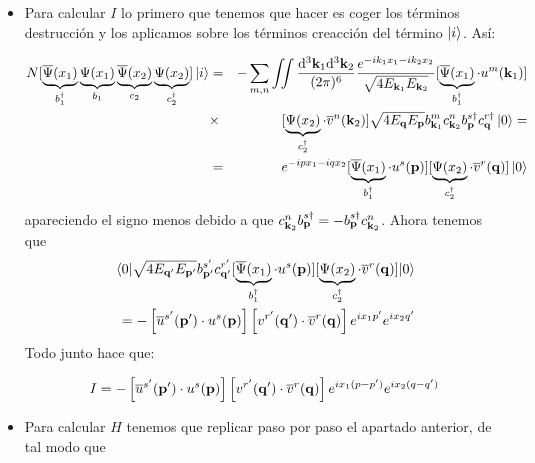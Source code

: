 \begin{solucion}
	\begin{itemize}
		\item Para calcular $I$ lo primero que tenemos que hacer es coger los términos destrucción y los aplicamos sobre los términos creacción del término $\ket{i}$. Así:
		
		\begin{eqnarray*}
				N[ \underbrace{ \overline{\Psi} (x_1)}_{b^\dagger_1}\underbrace{ \Psi (x_1)}_{b_1} \underbrace{ \overline{\Psi} 	(x_2)}_{c_2} \underbrace{ \Psi (x_2)}_{c^\dagger_2} ] \ket{i} & = & -\sum_{m,n} \iint \frac{\mathrm{d}^3 \mathbf{k}_1 \mathrm{d}^3 \mathbf{k}_2}{(2\pi)^6} \frac{e^{-i k_1 x_1 - i k_2 x_2}}{\sqrt{4E_{\mathbf{k}_1}E_{\mathbf{k}_2}}} [\underbrace{ \overline{\Psi} (x_1)}_{b^\dagger_1} \cdot u^m(\mathbf{k}_1)]  \\ & \times & [\underbrace{ \Psi (x_2)}_{c^\dagger_2} \cdot \overline{v}^n(\mathbf{k}_2)] \sqrt{4E_{\mathbf{q}} E_{\mathbf{p}}} b_{\mathbf{k}_1}^m c_{\mathbf{k}_2}^n b_{\mathbf{p}}^{s\dagger} c_ {\mathbf{q}}^{r \dagger}  \ket{0} =  \\
				& = &  e^{-i p x_1 - i q x_2} [\underbrace{ \overline{\Psi} (x_1)}_{b^\dagger_1} \cdot u^s(\mathbf{p})]  [\underbrace{ \Psi (x_2)}_{c^\dagger_2} \cdot \overline{v}^r(\mathbf{q})]  \ket{0}  
		\end{eqnarray*}
		apareciendo el signo menos debido a que $c_{\mathbf{k}_2}^n b_{\mathbf{p}}^{s\dagger}=- b_{\mathbf{p}}^{s\dagger}c_{\mathbf{k}_2}^n$. Ahora tenemos que 
		\begin{eqnarray*}
			\mel{0}{ \sqrt{4E_{\mathbf{q}'} E_{\mathbf{p}'}} b_{\mathbf{p}'}^{s'} c_{\mathbf{q}'}^{r'} [\underbrace{ \overline{\Psi}(x_1)}_{b^\dagger_1} \cdot u^s(\mathbf{p})] [\underbrace{ \Psi (x_2)}_{c^\dagger_2} \cdot \overline{v}^r(\mathbf{q})] }{0} \\ =- \left[ \overline{u}^{s'}(\mathbf{p}') \cdot u^{s}(\mathbf{p}) \right] \left[ v^{r'}(\mathbf{q}') \cdot \overline{v}^{r}(\mathbf{q}) \right] e^{ix_1  p'} e^{ix_2 q'}
		\end{eqnarray*}
		Todo junto hace que:
		
		\begin{equation*}
			I = - \left[ \overline{u}^{s'}(\mathbf{p}') \cdot u^{s}(\mathbf{p}) \right] \left[ v^{r'}(\mathbf{q}') \cdot \overline{v}^{r}(\mathbf{q}) \right]e^{ix_1(p-p')}e^{ix_2(q-q')}
		\end{equation*}
		
		\item Para calcular $H$ tenemos que replicar paso por paso el apartado anterior, de tal modo que 
		

\end{itemize}
\end{solucion}
